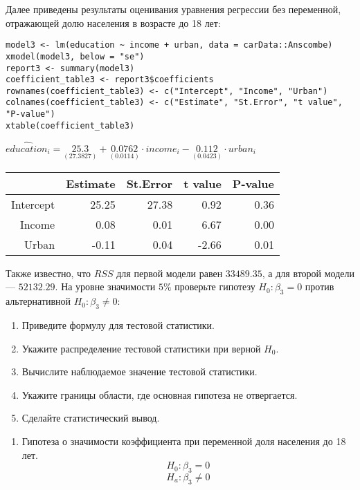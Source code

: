 \begin{problem}
\begin{enumerate}
Далее приведены результаты оценивания уравнения регрессии без переменной, отражающей долю населения в возрасте до 18 лет:

\begin{verbatim}
model3 <- lm(education ~ income + urban, data = carData::Anscombe)
xmodel(model3, below = "se")
report3 <- summary(model3)
coefficient_table3 <- report3$coefficients
rownames(coefficient_table3) <- c("Intercept", "Income", "Urban")
colnames(coefficient_table3) <- c("Estimate", "St.Error", "t value", "P-value")
xtable(coefficient_table3)
\end{verbatim}


\begin{center}

\ensuremath{\widehat{education}_i=\underset{( 27.3827 )}{ 25.3 }+\underset{( 0.0114)}{0.0762}\cdot income_i-\underset{( 0.0423)}{0.112}\cdot urban_i}

\begin{tabular}{rrrrr}
  \hline
 & Estimate & St.Error & t value & P-value \\
  \hline
Intercept & 25.25 & 27.38 & 0.92 & 0.36 \\
  Income & 0.08 & 0.01 & 6.67 & 0.00 \\
  Urban & -0.11 & 0.04 & -2.66 & 0.01 \\
   \hline
\end{tabular}

\end{center}
Также известно, что $RSS$ для первой модели равен $33489.35$, а для второй модели — $52132.29$. 
На уровне значимости $5\%$ проверьте гипотезу $H_0: \beta_3 = 0$ против альтернативной $H_0: \beta_3 \not= 0$:
\begin{enumerate}
\item Приведите формулу для тестовой статистики.
\item Укажите распределение тестовой статистики при верной $H_0$.
\item Вычислите наблюдаемое значение тестовой статистики.
\item Укажите границы области, где основная гипотеза не отвергается.
\item Сделайте статистический вывод.
\end{enumerate}
\end{enumerate}


\begin{sol}
  \begin{enumerate}
    \item Гипотеза о значимости коэффициента при переменной доля населения до 18 лет. 
    \[H_0: \beta_3=0\]
    \[H_a: \beta_3 \neq 0\]
    

\end{enumerate}
\end{sol}
\end{problem}
